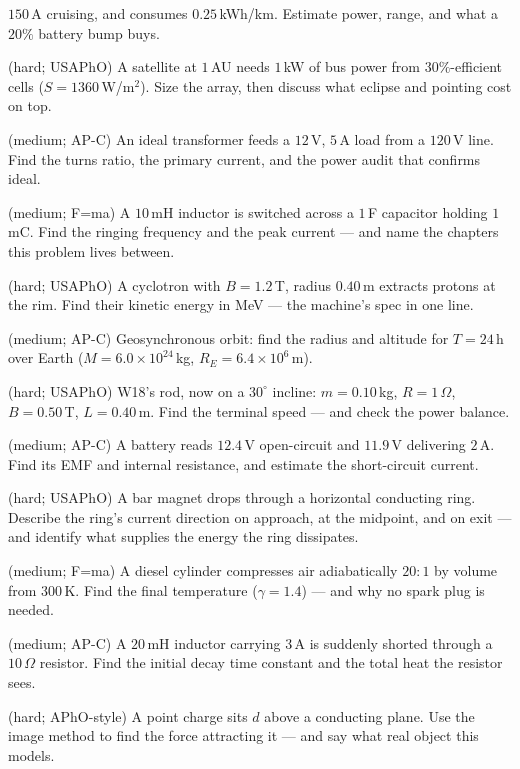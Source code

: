 \begin{description}
$150$\,A cruising, and consumes $0.25$\,kWh/km. Estimate power,
range, and what a $20\%$ battery bump buys.
\item[W36] (hard; USAPhO) A satellite at $1$\,AU needs $1$\,kW of bus
power from $30\%$-efficient cells ($S=1360$\,W/m$^{2}$). Size the
array, then discuss what eclipse and pointing cost on top.
\item[W37] (medium; AP-C) An ideal transformer feeds a $12$\,V,
$5$\,A load from a $120$\,V line. Find the turns ratio, the primary
current, and the power audit that confirms ideal.
\item[W38] (medium; F=ma) A $10$\,mH inductor is switched across a
$1$\,\textmu F capacitor holding $1$\,mC. Find the ringing frequency
and the peak current --- and name the chapters this problem lives
between.
\item[W39] (hard; USAPhO) A cyclotron with $B=1.2$\,T, radius
$0.40$\,m extracts protons at the rim. Find their kinetic energy in
MeV --- the machine's spec in one line.
\item[W40] (medium; AP-C) Geosynchronous orbit: find the radius and
altitude for $T=24$\,h over Earth ($M=6.0\times10^{24}$\,kg,
$R_E=6.4\times10^{6}$\,m).
\item[W41] (hard; USAPhO) W18's rod, now on a $30^{\circ}$ incline:
$m=0.10$\,kg, $R=1\,\Omega$, $B=0.50$\,T, $L=0.40$\,m. Find the
terminal speed --- and check the power balance.
\item[W42] (medium; AP-C) A battery reads $12.4$\,V open-circuit and
$11.9$\,V delivering $2$\,A. Find its EMF and internal resistance,
and estimate the short-circuit current.
\item[W43] (hard; USAPhO) A bar magnet drops through a horizontal
conducting ring. Describe the ring's current direction on approach,
at the midpoint, and on exit --- and identify what supplies the
energy the ring dissipates.
\item[W44] (medium; F=ma) A diesel cylinder compresses air
adiabatically $20{:}1$ by volume from $300$\,K. Find the final
temperature ($\gamma=1.4$) --- and why no spark plug is needed.
\item[W45] (medium; AP-C) A $20$\,mH inductor carrying $3$\,A is
suddenly shorted through a $10\,\Omega$ resistor. Find the initial
decay time constant and the total heat the resistor sees.
\item[W46] (hard; APhO-style) A point charge sits $d$ above a
conducting plane. Use the image method to find the force attracting
it --- and say what real object this models.
\end{description}

